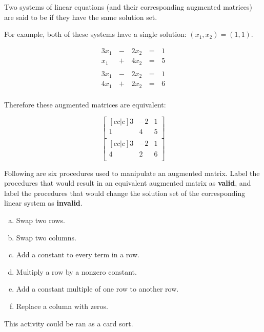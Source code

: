 \begin{applicationActivities}{1}{3}
\begin{definition}
  Two systems of linear equations (and their corresponding augmented
  matrices) are said to be  if they have the same
  solution set.

  For example, both of these systems have a single solution:
  \((x_1,x_2)=(1,1)\).

  \begin{multicols}{2}\noindent
    \begin{alignat*}{3}
      3x_1 &\,-\,& 2x_2 &\,=\,& 1 \\
      x_1 &\,+\,& 4x_2 &\,=\,& 5 \\
    \end{alignat*}
    \begin{alignat*}{3}
      3x_1 &\,-\,& 2x_2 &\,=\,& 1 \\
      4x_1 &\,+\,& 2x_2 &\,=\,& 6 \\
    \end{alignat*}
  \end{multicols}

  Therefore these augmented matrices are equivalent:

  \begin{multicols}{2}\noindent
    \[
      \begin{bmatrix}[cc|c]
        3 & -2 & 1\\
        1 &  4 & 5\\
      \end{bmatrix}
    \]
    \[
      \begin{bmatrix}[cc|c]
        3 & -2 & 1\\
        4 &  2 & 6\\
      \end{bmatrix}
    \]
  \end{multicols}
\end{definition}

\begin{activity}{10}
  Following are six procedures used to manipulate an augmented matrix.
  Label the procedures that would result in an equivalent augmented
  matrix as \textbf{valid}, and label the procedures that would
  change the solution set of the corresponding linear system as
  \textbf{invalid}.
  \begin{multicols}{2}
    \begin{enumerate}[a)]
      \item Swap two rows.
      \item Swap two columns.
      \item Add a constant to every term in a row.
      \item Multiply a row by a nonzero constant.
      \item Add a constant multiple of one row to another row.
      \item Replace a column with zeros.
    \end{enumerate}
  \end{multicols}
  \begin{TBLnote}
    This activity could be ran as a card sort.
  \end{TBLnote}
\end{activity}

\end{applicationActivities}
